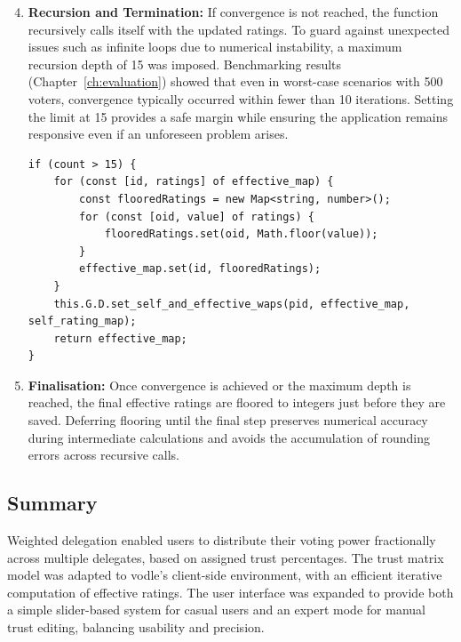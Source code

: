 \begin{enumerate}
    \setcounter{enumi}{3}
    \item \textbf{Recursion and Termination:} If convergence is not reached, the function recursively calls itself with the updated ratings. To guard against unexpected issues such as infinite loops due to numerical instability, a maximum recursion depth of 15 was imposed. Benchmarking results (Chapter~\ref{ch:evaluation}) showed that even in worst-case scenarios with 500 voters, convergence typically occurred within fewer than 10 iterations. Setting the limit at 15 provides a safe margin while ensuring the application remains responsive even if an unforeseen problem arises.


\begin{verbatim}
if (count > 15) {
    for (const [id, ratings] of effective_map) {
        const flooredRatings = new Map<string, number>();
        for (const [oid, value] of ratings) {
            flooredRatings.set(oid, Math.floor(value));
        }
        effective_map.set(id, flooredRatings);
    }
    this.G.D.set_self_and_effective_waps(pid, effective_map, self_rating_map);
    return effective_map;
}
\end{verbatim}

    \item \textbf{Finalisation:} Once convergence is achieved or the maximum depth is reached, the final effective ratings are floored to integers just before they are saved. Deferring flooring until the final step preserves numerical accuracy during intermediate calculations and avoids the accumulation of rounding errors across recursive calls.
\end{enumerate}


\subsection{Summary}

Weighted delegation enabled users to distribute their voting power fractionally across multiple delegates, based on assigned trust percentages. The trust matrix model was adapted to vodle's client-side environment, with an efficient iterative computation of effective ratings. The user interface was expanded to provide both a simple slider-based system for casual users and an expert mode for manual trust editing, balancing usability and precision.


